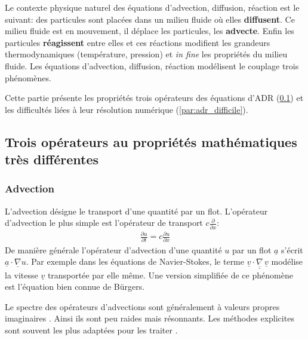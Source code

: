 Le contexte physique naturel des équations d'advection, diffusion, réaction est le suivant:
des particules sont placées dans un milieu fluide où elles \textbf{diffusent}. Ce milieu fluide
est en mouvement, il déplace les particules, les \textbf{advecte}.
Enfin les particules \textbf{réagissent} entre elles et ces réactions modifient les grandeurs thermodynamiques (température, pression) et \textit{in fine} les propriétés
du milieu fluide.
Les équations d'advection, diffusion, réaction modélisent le couplage trois phénomènes.\par 
Cette partie présente les propriétés trois opérateurs des équations d'ADR (\ref{par:adr_3_operator}) et
les difficultés liées à leur résolution numérique (\ref{par:adr_difficile}).

\subsection{Trois opérateurs au propriétés mathématiques très différentes}\label{par:adr_3_operator}
\subsubsection{Advection}
    L'advection désigne le transport d'une quantité par un flot. L'opérateur d'advection le plus simple est l'opérateur
    de transport $c \frac{\partial}{\partial x}$:
    \begin{align}\frac{\partial u}{\partial t} = c \frac{\partial u}{\partial x}\end{align}
    De manière générale l'opérateur d’advection d'une quantité $u$ par un flot $\underline a$ s'écrit $\underline a \cdot \underline{\nabla} u$.
    Par exemple dans les équations de Navier-Stokes, le terme $\underline{v} \cdot \underline{\underline \nabla} \, \underline{v}$ modélise 
    la vitesse $\underline v$ transportée par elle même. Une version simplifiée de ce phénomène est l'équation bien connue de Bürgers.\par 
    Le spectre des opérateurs d'advections sont généralement à valeurs propres imaginaires \cite[Chap.~10]{LeVeque2007}.
    Ainsi ils sont peu raides mais résonnants. Les méthodes explicites sont souvent les plus adaptées pour les traiter \cite[Chap.~10]{LeVeque2007}.

